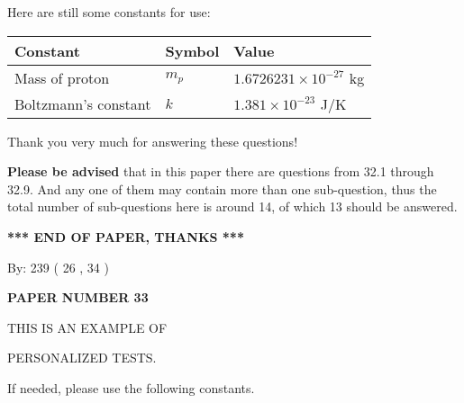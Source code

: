 \documentclass[12pt]{article}
\begin{document}
 
 
   
   
 \vspace{0.2in}
Here are still some constants for use:
 
 
\noindent\begin{tabular}{|l|l|l|}
\hline
Constant & Symbol & Value \\
\hline
 
Mass of proton &
$m_p$ &
 $ 1.6726231 \times 10^{-27} $
kg \\
\hline
 
Boltzmann's constant &
$k$ &
 $ 1.381 \times 10^{-23} $
J/K \\
\hline
 
\end{tabular}
 
Thank you very much for answering these questions!
 
{\textbf{\large{Please be advised}}} that in this paper there are questions from
32.1 through
32.9.
And any one of them may contain more than one sub-question, thus the total number
of sub-questions here is around 14, of which
13 should be answered.
 
   
   
   
   
\vspace{1.0in} 
{\textbf{\large{ *** END OF PAPER, THANKS *** }}} 
   
   
\hspace{1.0in} By: 
         239 (          26 ,           34 )
   
   
   
   
\newpage 
\setcounter{page}{ 
    33001 } 
   
   
   
   
 {\textbf{ \Large{ PAPER NUMBER           33  }}}
   
   
\vspace{0.2in}
   
   
   
   
   
   
 \vspace{0.2in}
 
 
{\Huge  THIS IS AN EXAMPLE OF}
 
{\Huge  PERSONALIZED TESTS. }
 
If needed, please use the following constants.
 
\end{document}

